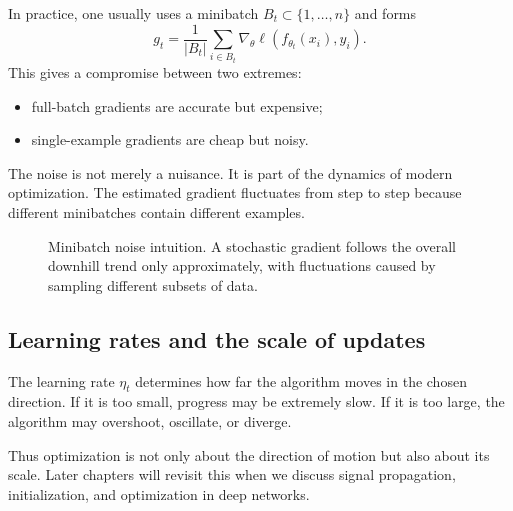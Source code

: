 In practice, one usually uses a minibatch $B_t\subset\{1,\dots,n\}$ and forms
\[
g_t=\frac1{|B_t|}\sum_{i\in B_t}\nabla_\theta \ell(f_{\theta_t}(x_i),y_i).
\]
This gives a compromise between two extremes:

\begin{itemize}
    \item full-batch gradients are accurate but expensive;
    \item single-example gradients are cheap but noisy.
\end{itemize}

The noise is not merely a nuisance. It is part of the dynamics of modern optimization. The estimated gradient fluctuates from step to step because different minibatches contain different examples.

\begin{figure}[tbp]
\centering
{}
\caption{Minibatch noise intuition. A stochastic gradient follows the overall downhill trend only approximately, with fluctuations caused by sampling different subsets of data.}
\end{figure}

\subsection*{Learning rates and the scale of updates}

The learning rate $\eta_t$ determines how far the algorithm moves in the chosen direction. If it is too small, progress may be extremely slow. If it is too large, the algorithm may overshoot, oscillate, or diverge.

Thus optimization is not only about the direction of motion but also about its scale. Later chapters will revisit this when we discuss signal propagation, initialization, and optimization in deep networks.

